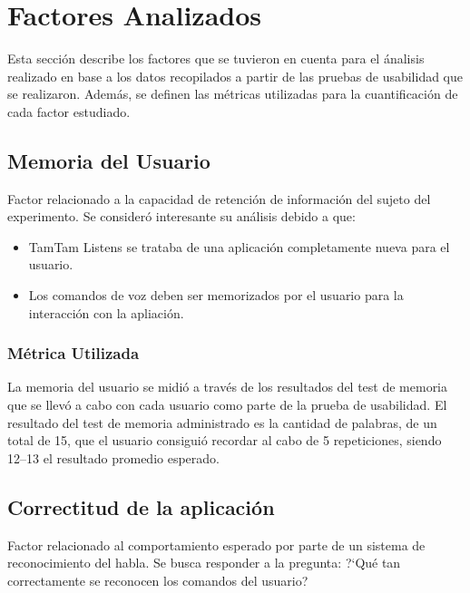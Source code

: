 \section{Factores Analizados}
\label{sec:factores}

Esta secci\'on describe los factores que se tuvieron en cuenta para el \'analisis realizado
en base a los datos recopilados a partir de las pruebas de usabilidad que se realizaron.
Adem\'as, se definen las m\'etricas utilizadas para la cuantificaci\'on de cada factor estudiado.

\subsection{Memoria del Usuario}
Factor relacionado a la capacidad de retenci\'on de informaci\'on del sujeto del experimento.
Se consider\'o interesante su an\'alisis debido a que:
\begin{itemize}
	\item TamTam Listens se trataba de una aplicaci\'on completamente nueva para el usuario.
	\item Los comandos de voz deben ser memorizados por el usuario para la interacci\'on con
	la apliaci\'on.
\end{itemize}
\subsubsection{M\'etrica Utilizada}
La memoria del usuario se midi\'o a trav\'es de los resultados del test de memoria que se llev\'o
a cabo con cada usuario como parte de la prueba de usabilidad.
El resultado del test de memoria administrado es la cantidad de palabras, de un total de 15,
que el usuario consigui\'o recordar al cabo de 5 repeticiones, siendo 12--13 el resultado promedio
esperado.

\subsection{Correctitud de la aplicaci\'on}
Factor relacionado al comportamiento esperado por parte de un sistema de reconocimiento del
habla. Se busca responder a la pregunta: {?`}Qu\'e tan correctamente se reconocen los comandos 
del usuario?
